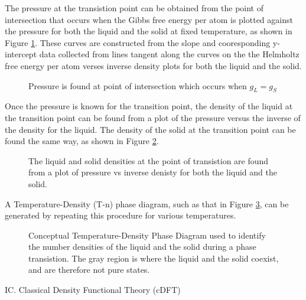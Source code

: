 \documentclass[12pt]{article}
\begin{document}
The pressure at the transistion point can be obtained from the point of intersection that occurs when the Gibbs free energy per atom is plotted against the pressure for both the liquid and the solid at fixed temperature, as shown in Figure \ref{fig:GibbsvsP}. These curves are constructed from the slope and cooresponding y-intercept data collected from lines tangent along the curves on the the Helmholtz free energy per atom verses inverse density plots for both the liquid and the solid. 
\begin{figure}[h!]
    \centering
    \caption{Pressure is found at point of intersection which occurs when $g_L=g_S$}
    \label{fig:GibbsvsP}
  \end{figure}


Once the pressure is known for the transition point, the density of the liquid at the transition point can be found from a plot of the pressure versus the inverse of the density for the liquid. The density of the solid at the transition point can be found the same way, as shown in Figure \ref{fig:Pvsinvn}.

\begin{figure}[h!]
    \centering
    \caption{The liquid and solid densities at the point of transistion are found from a plot of pressure vs inverse denisty for both the liquid and the solid.}
    \label{fig:Pvsinvn}
  \end{figure}

A Temperature-Density (T-n) phase diagram, such as that in Figure \ref{fig:T-n_Diagram}, can be generated by repeating this procedure for various temperatures. %

\begin{figure}[h!]
    \centering
    \caption{Conceptual Temperature-Density Phase Diagram used to identify the number densities of the liquid and the solid during a phase transistion. The gray region is where the liquid and the solid coexist, and are therefore not pure states.}
    \label{fig:T-n_Diagram}
  \end{figure} 
\[\]
IC. Classical Density Functional Theory (cDFT)
\end{document}
